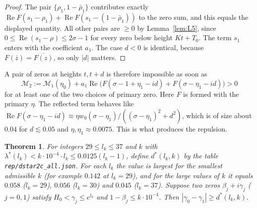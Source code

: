 \documentclass[11pt]{amsart}
\numberwithin{equation}{section}
\newtheorem{theorem}{Theorem}[section]
\theoremstyle{definition}
\theoremstyle{remark}
\newcommand{\Rp}{\operatorname{Re}}
\newcommand{\code}[1]{\texttt{#1}}
\begin{document}
\begin{proof}
The pair $\{\rho_1, 1-\bar\rho_1\}$ contributes exactly $\Rp F(s_1 - \rho_1) + \Rp F(s_1 - (1-\bar\rho_1))$ to the zero sum, and this equals the displayed quantity.
All other pairs are $\ge 0$ by Lemma~\ref{lem:L5}, since $0 \le \Rp(s_1-\rho) \le 2\sigma - 1$ for every zero below height $Kt+T_0$.
The term $s_1$ enters with the coefficient $a_1$.
The case $d < 0$ is identical, because $F(\bar z) = \overline{F(z)}$, so only $|d|$ matters.
\end{proof}

A pair of zeros at heights $t, t+d$ is therefore impossible as soon as
\[
\mathcal M_2 := \mathcal M_1(\eta_0) + a_1\Rp\big(F(\sigma-1+\eta_1-id) + F(\sigma-\eta_1-id)\big) > 0
\]
for at least one of the two choices of primary zero.
Here $F$ is formed with the primary $\eta$.
The reflected term behaves like $\Rp F(\sigma - \eta_1 - id) \approx \eta w_0(\sigma-\eta_1)/((\sigma-\eta_1)^2 + d^2)$, which is of size about $0.04$ for $d \lesssim 0.05$ and $\eta, \eta_1 \approx 0.0075$.
This is what produces the repulsion.

\begin{theorem}\label{thm:rep}
For integers $29 \le l_k \le 37$ and $k$ with $\lambda^*(l_k) < k\cdot10^{-4}\cdot l_k \le 0.0125(l_k-1)$, define $d^*(l_k,k)$ by the table \code{rep/dstar2c\_all.json}.
For each $l_k$ the value is largest for the smallest admissible $k$ (for example $0.142$ at $l_k = 29$), and for the large values of $k$ it equals $0.058$ ($l_k = 29$), $0.056$ ($l_k = 30$) and $0.045$ ($l_k = 37$).
Suppose two zeros $\beta_j + i\gamma_j$ ($j = 0,1$) satisfy $H_0 < \gamma_j \le e^{l_k}$ and $1-\beta_j \le k\cdot 10^{-4}$.
Then $|\gamma_0 - \gamma_1| \ge d^*(l_k, k)$.
\end{theorem}
\end{document}
